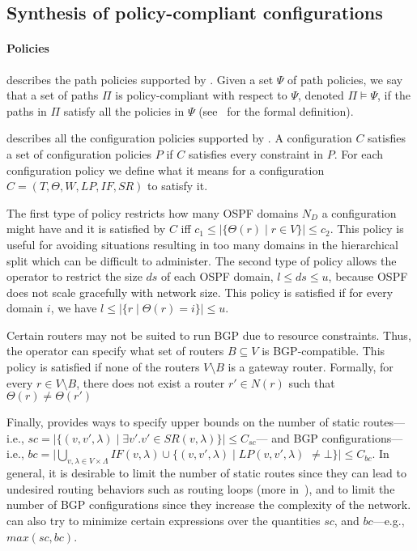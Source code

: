 \subsection{Synthesis of policy-compliant configurations}



\paragraph{Policies}
 describes the path policies supported by \name.
Given  a set $\Psi$ of
path policies, we say that
a set of paths $\Pi$ is policy-compliant with respect to $\Psi$, denoted 
$\Pi \models \Psi$,
if the paths in $\Pi$ satisfy all the policies in $\Psi$ (see~\cite{genesis} for the formal definition). 


 describes all the configuration policies supported by \name.
A configuration $C$ satisfies a set of configuration policies $P$
if $C$ satisfies every constraint in $P$.
For each configuration policy 
we define what it means for  a configuration $C=(T,\Theta,W,LP,IF,SR)$ to satisfy it.

The first type of policy restricts how many OSPF domains $N_D$ a
configuration might have
and it is satisfied by $C$ iff $c_1\leq |\{\Theta(r)\mid r\in V\}|\leq
c_2$.  This policy is useful for avoiding situations resulting in too
many domains in the hierarchical split which can be difficult to
administer.  The second type of policy allows the operator to restrict
the size $ds$ of each OSPF domain, $l\leq ds\leq u$, because OSPF does
not scale gracefully with network size.  This policy is satisfied if
for every domain $i$, we have $l\leq |\{r \mid \Theta(r)=i\}|\leq u$.


Certain 
	routers may not be suited to run BGP due to resource
	constraints. Thus, the operator can specify what set of 
	routers $B\subseteq V$ is BGP-compatible.  
	This policy is satisfied if none of the routers $V\setminus B$
	is a gateway router.
	Formally, for every $r\in V\setminus B$,
	there does not exist a router $r'\in N(r)$ such that $\Theta(r) \not= \Theta(r')$

Finally, \name provides ways to specify upper bounds on the number 
of
static routes---i.e., $sc=|\{(v, v', \lambda)\mid \exists v'. v' \in SR(v,\lambda)\}|\leq C_{sc}$--- and
BGP configurations---i.e., 
$bc=|\bigcup_{v,\lambda\in V\times\Lambda} IF(v,\lambda)\cup \{(v,v',\lambda)\mid LP(v,v',\lambda)$ $\neq \bot\}|\leq C_{bc}$.
In general, it is desirable to limit the number of static routes since they
can lead to undesired routing behaviors such as routing loops (more in~), and to limit the number of BGP configurations
since they increase the complexity of the network.
\name can  also try to minimize certain expressions over the quantities $sc$, and $bc$---e.g., $max(sc, bc)$. 

